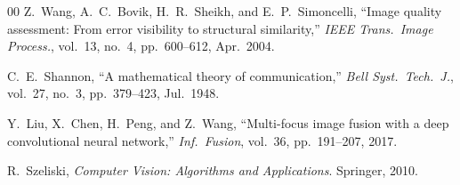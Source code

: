 \documentclass[conference]{IEEEtran}
\begin{document}
\begin{thebibliography}{00}
Z.~Wang, A.~C.~Bovik, H.~R.~Sheikh, and E.~P.~Simoncelli, ``Image quality assessment: From error visibility to structural similarity,''
\textit{IEEE Trans.\ Image Process.}, vol.~13, no.~4, pp.~600--612, Apr.\ 2004.

C.~E.~Shannon, ``A mathematical theory of communication,''
\textit{Bell Syst.\ Tech.\ J.}, vol.~27, no.~3, pp.~379--423, Jul.\ 1948.

Y.~Liu, X.~Chen, H.~Peng, and Z.~Wang, ``Multi-focus image fusion with a deep convolutional neural network,''
\textit{Inf.\ Fusion}, vol.~36, pp.~191--207, 2017.

R.~Szeliski, \textit{Computer Vision: Algorithms and Applications}.
Springer, 2010.

\end{thebibliography}
\end{document}
